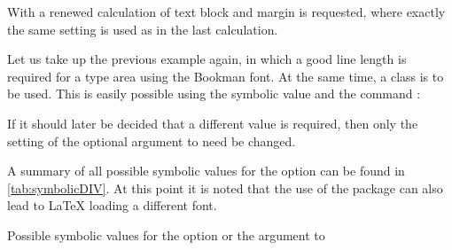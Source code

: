 With  a
renewed calculation of text block and margin is requested, where
exactly the same setting is used as in the last calculation.

\begin{Example}
  Let us take up the previous example again, in which a good line
  length is required for a type area using the Bookman font. At the
  same time, a {\KOMAScript} class is to be used. This is easily
  possible using the symbolic value  and the command
  :
If it should later be decided that a different  value is
required, then only the setting of the optional argument to
 need be changed.
\end{Example}

A summary of all possible symbolic values for the  option
can be found in \autoref{tab:symbolicDIV}. At this point it is noted
that the use of the  package
can also lead to \LaTeX{} loading a different font.

\begin{table}
  \caption[{Symbolic values for the  option and the
     argument to }]{Possible symbolic values for the  option or the  argument to
    }
  \label{tab:symbolicDIV}
  \begin{desctabular}
  \end{desctabular}
\end{table}

